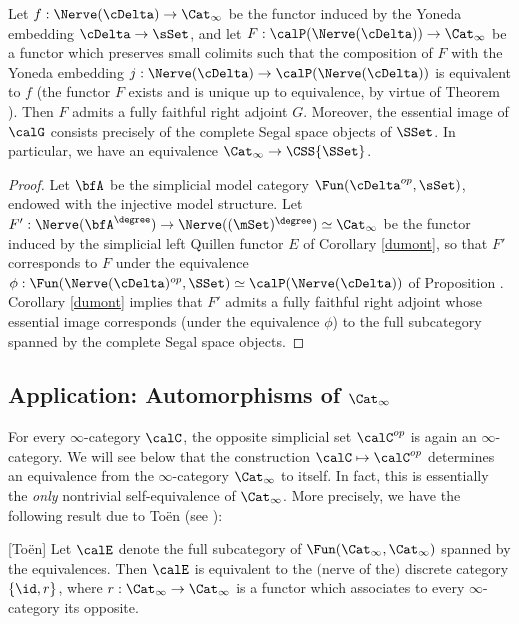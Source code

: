 \begin{corollary}\label{presquare}
Let $f: \Nerve(\cDelta) \rightarrow \Cat_{\infty}$ be the functor induced by the 
Yoneda embedding $\cDelta \rightarrow \sSet$, and let $F: \calP( \Nerve(\cDelta)) \rightarrow \Cat_{\infty}$ be a functor which preserves small colimits such that the composition of $F$
with the Yoneda embedding $j: \Nerve(\cDelta) \rightarrow \calP( \Nerve(\cDelta) )$
is equivalent to $f$ (the functor $F$ exists and is unique up to equivalence, by virtue of
Theorem ). Then $F$ admits a fully faithful right adjoint $G$.
Moreover, the essential image of $\calG$ consists precisely of the complete Segal space objects of $\SSet$. In particular, we have an equivalence $\Cat_{\infty} \rightarrow \CSS{\SSet}$.
\end{corollary}

\begin{proof}
Let $\bfA$ be the simplicial model category $\Fun( \cDelta^{op}, \sSet)$, endowed with the injective model structure. Let $F': \Nerve( \bfA^{\degree} ) \rightarrow \Nerve( (\mSet)^{\degree}) \simeq \Cat_{\infty}$ be the functor induced by the simplicial left Quillen functor $E$ of Corollary \ref{dumont}, so that $F'$ corresponds to $F$ under the equivalence $\phi: \Fun( \Nerve(\cDelta)^{op}, \SSet) \simeq \calP( \Nerve(\cDelta) )$ of Proposition . Corollary \ref{dumont} implies that $F'$ admits a fully faithful right adjoint whose essential image corresponds (under the equivalence $\phi$) to the full subcategory spanned by the complete Segal space objects.
\end{proof}

\subsection{Application: Automorphisms of \texorpdfstring{$\Cat_{\infty}$}{Cat\_infinity}}\label{cataut}\label{bisec4.4}

For every $\infty$-category $\calC$, the opposite simplicial set
$\calC^{op}$ is again an $\infty$-category. We will see below that the construction
$\calC \mapsto \calC^{op}$ determines an equivalence from the $\infty$-category
$\Cat_{\infty}$ to itself. In fact, this is essentially the {\em only} nontrivial self-equivalence of
$\Cat_{\infty}$. More precisely, we have the following result due to To\"{e}n (see \cite{toenchar}):

\begin{theorem}\label{cabbi}[To\"{e}n]
Let $\calE$ denote the full subcategory of $\Fun( \Cat_{\infty}, \Cat_{\infty})$ spanned by the equivalences. Then $\calE$ is equivalent to the $($nerve of the$)$ discrete category
$\{ \id, r \}$, where $r: \Cat_{\infty} \rightarrow \Cat_{\infty}$ is a functor which associates to every
$\infty$-category its opposite. 
\end{theorem}

